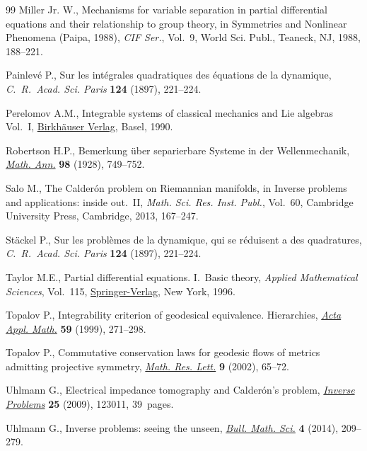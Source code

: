 \documentclass[11pt]{article}
\numberwithin{equation}{section}
\begin{document}
\begin{thebibliography}{99}
Miller Jr. W., Mechanisms for variable separation in partial differential
 equations and their relationship to group theory, in Symmetries and Nonlinear
 Phenomena ({P}aipa, 1988), \textit{CIF Ser.}, Vol.~9, World Sci. Publ.,
 Teaneck, NJ, 1988, 188--221.

Painlev\'e P., Sur les int{\'e}grales quadratiques des \'equations de la
 dynamique, \textit{C.~R.~Acad. Sci. Paris} \textbf{124} (1897), 221--224.

Perelomov A.M., Integrable systems of classical mechanics and {L}ie algebras~
 {V}ol.~{I}, \href{https://doi.org/10.1007/978-3-0348-9257-5}{Birkh\"{a}user Verlag}, Basel, 1990.

Robertson H.P., Bemerkung \"{u}ber separierbare {S}ysteme in der
 {W}ellenmechanik, \href{https://doi.org/10.1007/BF01451624}{\textit{Math. Ann.}} \textbf{98} (1928), 749--752.

Salo M., The {C}alder\'{o}n problem on {R}iemannian manifolds, in Inverse
 problems and applications: inside out.~{II}, \textit{Math. Sci. Res. Inst.
 Publ.}, Vol.~60, Cambridge University Press, Cambridge, 2013, 167--247.

St\"ackel P., Sur les probl\`emes de la dynamique, qui se r\'eduisent a des
 quadratures, \textit{C.~R.~Acad. Sci. Paris} \textbf{124} (1897), 221--224.

Taylor M.E., Partial differential equations. {I}.~{B}asic theory,
 \textit{Applied Mathematical Sciences}, Vol.~115, \href{https://doi.org/10.1007/978-1-4684-9320-7}{Springer-Verlag}, New York,
 1996.

Topalov P., Integrability criterion of geodesical equivalence. {H}ierarchies,
 \href{https://doi.org/10.1023/A:1006369525091}{\textit{Acta Appl. Math.}} \textbf{59} (1999), 271--298.

Topalov P., Commutative conservation laws for geodesic flows of metrics
 admitting projective symmetry, \href{https://doi.org/10.4310/MRL.2002.v9.n1.a5}{\textit{Math. Res. Lett.}} \textbf{9} (2002),
 65--72.

Uhlmann G., Electrical impedance tomography and {C}alder\'{o}n's problem,
 \href{https://doi.org/10.1088/0266-5611/25/12/123011}{\textit{Inverse Problems}} \textbf{25} (2009), 123011, 39~pages.

Uhlmann G., Inverse problems: seeing the unseen, \href{https://doi.org/10.1007/s13373-014-0051-9}{\textit{Bull. Math. Sci.}}
 \textbf{4} (2014), 209--279.

\end{thebibliography}
\end{document}
